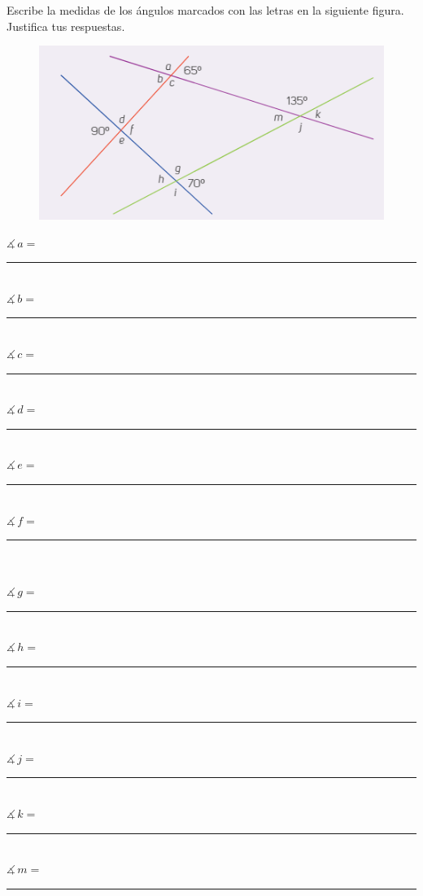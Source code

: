 Escribe la medidas de los ángulos marcados con las letras en la siguiente figura. Justifica tus respuestas.
\begin{figure}[H]
    \centering
    \includegraphics[scale=1]{Imagenes/Angulos_02.png}
\end{figure}
\noindent
\begin{multicols}{2}
$\measuredangle \, a = $ \, \rule{2cm}{0.1mm} \\
$\measuredangle \, b = $ \, \rule{2cm}{0.1mm} \\
$\measuredangle \, c = $ \, \rule{2cm}{0.1mm} \\
$\measuredangle \, d = $ \, \rule{2cm}{0.1mm} \\
$\measuredangle \, e = $ \, \rule{2cm}{0.1mm} \\
$\measuredangle \, f = $ \, \rule{2cm}{0.1mm} \\
\columnbreak
\\
$\measuredangle \, g = $ \, \rule{2cm}{0.1mm} \\
$\measuredangle \, h = $ \, \rule{2cm}{0.1mm} \\
$\measuredangle \, i = $ \, \rule{2cm}{0.1mm} \\
$\measuredangle \, j = $ \, \rule{2cm}{0.1mm} \\
$\measuredangle \, k = $ \, \rule{2cm}{0.1mm} \\
$\measuredangle \, m = $ \, \rule{2cm}{0.1mm}
\end{multicols}


